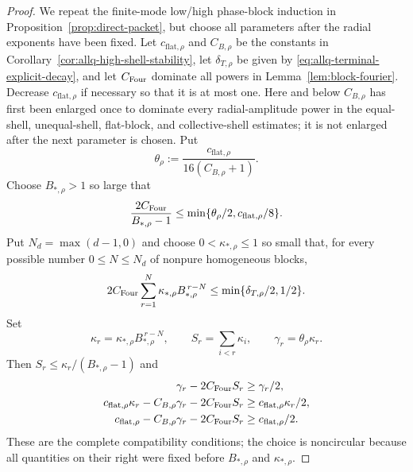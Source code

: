 \documentclass[11pt]{article}
\numberwithin{equation}{section}
\theoremstyle{remark}
\theoremstyle{definition}
\begin{document}
\begin{proof}
We repeat the finite-mode low/high phase-block induction in
Proposition~\ref{prop:direct-packet}, but choose all parameters after the
radial exponents have been fixed. Let
$c_{\mathrm{flat},\rho}$ and $C_{B,\rho}$ be the constants in
Corollary~\ref{cor:allq-high-shell-stability}, let
$\delta_{T,\rho}$ be given by
\eqref{eq:allq-terminal-explicit-decay}, and let $C_{\rm Four}$ dominate
all powers in Lemma~\ref{lem:block-fourier}. Decrease
$c_{\mathrm{flat},\rho}$ if necessary so that it is at most one.
Here and below $C_{B,\rho}$ has first been enlarged once to dominate every
radial-amplitude power in the equal-shell, unequal-shell, flat-block, and
collective-shell estimates; it is not enlarged after the next parameter is
chosen.  Put
\begin{equation}\label{eq:allq-packet-theta}
 \theta_\rho
 :=\frac{c_{\mathrm{flat},\rho}}
          {16(C_{B,\rho}+1)}.
\end{equation}
Choose $B_{*,\rho}>1$ so large that
\begin{equation}\label{eq:allq-packet-ratio}
 \frac{2C_{\rm Four}}{B_{*,\rho}-1}
 \le\min\{\theta_\rho/2,c_{\mathrm{flat},\rho}/8\}.
\end{equation}
Put $N_d=\max(d-1,0)$ and choose
$0<\kappa_{*,\rho}\le1$ so small that, for every possible number
$0\le N\le N_d$ of nonpure homogeneous blocks,
\begin{equation}\label{eq:allq-packet-terminal-budget}
 2C_{\rm Four}\sum_{r=1}^N
 \kappa_{*,\rho}B_{*,\rho}^{\,r-N}
 \le\min\{\delta_{T,\rho}/2,1/2\}.
\end{equation}
Set
\[
 \kappa_r=\kappa_{*,\rho}B_{*,\rho}^{\,r-N},
 \qquad S_r=\sum_{i<r}\kappa_i,
 \qquad \gamma_r=\theta_\rho\kappa_r.
\]
Then $S_r\le\kappa_r/(B_{*,\rho}-1)$ and
\begin{align}
 \gamma_r-2C_{\rm Four}S_r&\ge\gamma_r/2,
 \label{eq:allq-packet-hierarchy-a}\\
 c_{\mathrm{flat},\rho}\kappa_r
 -C_{B,\rho}\gamma_r-2C_{\rm Four}S_r
 &\ge c_{\mathrm{flat},\rho}\kappa_r/2,
 \label{eq:allq-packet-hierarchy-b}\\
 c_{\mathrm{flat},\rho}
 -C_{B,\rho}\gamma_r-2C_{\rm Four}S_r
 &\ge c_{\mathrm{flat},\rho}/2.
 \label{eq:allq-packet-hierarchy-c}
\end{align}
These are the complete compatibility conditions; the choice is
noncircular because all quantities on their right were fixed before
$B_{*,\rho}$ and $\kappa_{*,\rho}$.


\end{proof}
\end{document}

